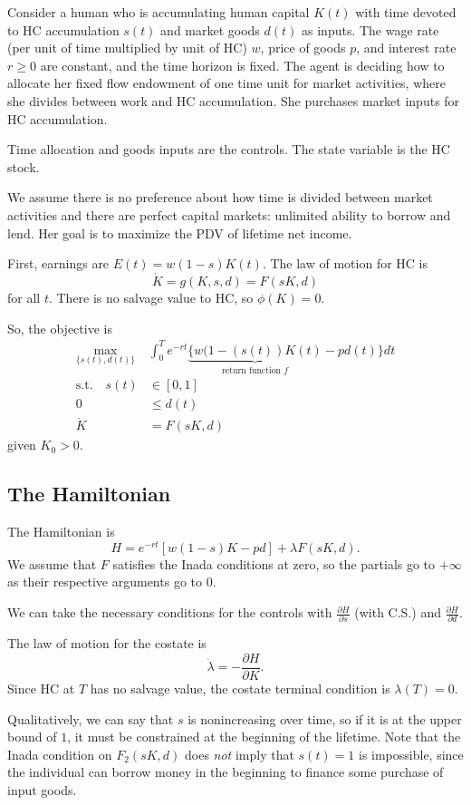 \documentclass{tufte-handout}
\theoremstyle{definition}
\begin{document}
Consider a human who is accumulating human capital $K(t) $ with time devoted to HC accumulation $s(t)$ and market goods $d(t)$ as inputs. The wage rate (per unit of time multiplied by unit of HC) $w$, price of goods $p$, and interest rate $r \ge 0$ are constant, and the time horizon is fixed. The agent is deciding how to allocate her fixed flow endowment of one time unit for market activities, where she divides between work and HC accumulation. She purchases market inputs for HC accumulation.

Time allocation and goods inputs are the controls. The state variable is the HC stock.

We assume there is no preference about how time is divided between market activities and there are perfect capital markets: unlimited ability to borrow and lend. Her goal is to maximize the PDV of lifetime net income.

First, earnings are $E(t) = w(1-s)K(t)$. The law of motion for HC is \[
	\dot{K} = g(K,s,d) = F(sK,d)
\] for all $t$. There is no salvage value to HC, so $\phi(K) = 0$.

So, the objective is
\begin{align*}
	\max_{\{s(t),d(t)\}} &\int_{0}^{T} e^{-rt}\underbrace{ \{w(1-(s(t))K(t)}_{\text{return function } f} - pd(t)\}dt \\
	\text{s.t.} \quad s(t) &\in [0,1] \\
	0 &\le d(t) \\
	\dot{K} &= F(sK,d)
\end{align*} given $K_0 > 0$.

\subsection{The Hamiltonian}

The Hamiltonian is \[
	H = e^{-rt} \left[ w(1-s)K - pd \right] + \lambda F(sK,d)
.\] We assume that $F$ satisfies the Inada conditions at zero, so the partials go to $+\infty$ as their respective arguments go to $0$.

We can take the necessary conditions for the controls with $\frac{\partial H}{\partial s}$ (with C.S.) and $\frac{\partial H}{\partial d}$.

The law of motion for the costate is \[
	\dot{\lambda} = - \frac{\partial H}{\partial K} 
.\] Since HC at $T$ has no salvage value, the costate terminal condition is $\lambda(T) = 0$.

Qualitatively, we can say that $s$ is nonincreasing over time, so if it is at the upper bound of $1$, it must be constrained at the beginning of the lifetime. Note that the Inada condition on $F_2(sK,d)$ does \emph{not} imply that $s(t) = 1$ is impossible, since the individual can borrow money in the beginning to finance some purchase of input goods.
\end{document}
